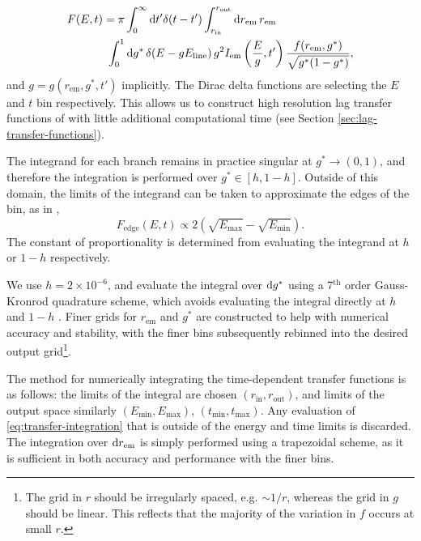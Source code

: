 \begin{align}
    \label{eq:transfer-integration}
    F(E, t) &=
    \pi
    \int_0^\infty \text{d} t^\prime \delta(t - t^\prime)
    \int_{r_\text{in}}^{r_\text{out}} \text{d} r_\text{em}\,r_\text{em} \nonumber \\
    &\ \int_0^1 \text{d} g^\ast\, \delta(E - gE_\text{line})\, g^2 I_\text{em}\left(\frac{E}{g}, t^\prime\right) \frac{f(r_\text{em}, g^\ast)}{\sqrt{g^\ast (1 - g^\ast)}},
\end{align}
\noindent and $g = g( r_\text{em}, g^\ast, t')$ implicitly. The Dirac delta functions are selecting the $E$ and $t$ bin respectively. This allows us to construct high resolution lag transfer functions of \cite{reynolds_x-ray_1999} with little additional computational time (see Section \ref{sec:lag-transfer-functions}). 

The integrand for each branch remains in practice singular at $g^\ast \rightarrow (0, 1)$, and therefore the integration is performed over $g^\ast \in [h, 1 - h]$. Outside of this domain, the limits of the integrand can be taken to approximate the edges of the bin, as in \cite{dauser_broad_2010},
\begin{equation}
   F_\text{edge}(E,t) \propto 2\left( \sqrt{E_\text{max}} - \sqrt{E_\text{min}} \right).
\end{equation}
The constant of proportionality is determined from evaluating the integrand at $h$ or $1 - h$ respectively.

We use $h = 2 \times 10^{-6}$, and evaluate the integral over $\text{d} g^\ast$ using a 7$^\text{th}$ order Gauss-Kronrod quadrature scheme, which avoids evaluating the integral directly at $h$ and $1 - h$ \citep{}. Finer grids for $r_\text{em}$ and $g^\ast$ are constructed to help with numerical accuracy and stability, with the finer bins subsequently rebinned into the desired output grid\footnote{The grid in $r$ should be irregularly spaced, e.g. $\sim 1 / r$, whereas the grid in $g$ should be linear. This reflects that the majority of the variation in $f$ occurs at small $r$.}.

The method for numerically integrating the time-dependent transfer functions is as follows: the limits of the integral are chosen $(r_\text{in}, r_\text{out})$, and limits of the output space similarly $(E_\text{min}, E_\text{max})$, $(t_\text{min}, t_\text{max})$. Any evaluation of \eqref{eq:transfer-integration} that is outside of the energy and time limits is discarded.  The integration over $\text{d} r_\text{em}$ is simply performed using a trapezoidal scheme, as it is sufficient in both accuracy and performance with the finer bins. 

